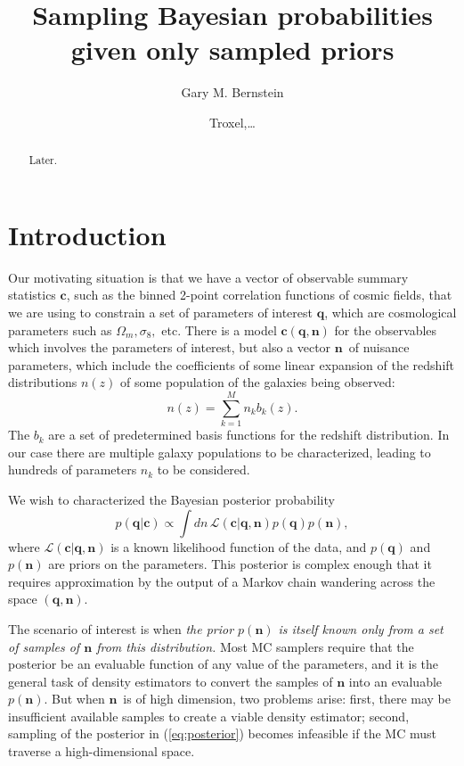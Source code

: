 \documentclass[linenumbers, onecolumn]{aastex631}
\newcommand{\vecc}{\ensuremath{\mathbf{c}}}
\newcommand{\vecq}{\ensuremath{\mathbf{q}}}
\newcommand{\vecn}{\ensuremath{\mathbf{n}}}
\newcommand{\likeli}{\mathcal{L}}
\begin{document}
\title{Sampling Bayesian probabilities given only sampled priors}

\author[0000-0002-8613-8259]{Gary M. Bernstein}

\author{Troxel,\ldots}

\begin{abstract}
	\vspace{0.2in}
Later.
\end{abstract}
\reportnum{}

\section{Introduction} \label{sec:intro}

Our motivating situation is that we have a vector of observable summary statistics \vecc, such as the binned 2-point correlation functions of cosmic fields, that we are using to constrain a set of parameters of interest \vecq, which are cosmological parameters such as $\Omega_m, \sigma_8,$ etc.  There is a model $\vecc(\vecq,\vecn)$ for the observables which involves the parameters of interest, but also a vector \vecn\ of nuisance parameters, which include the coefficients of some linear expansion of the redshift distributions $n(z)$ of some population of the galaxies being observed:
\begin{equation}
  n(z) = \sum_{k=1}^{M} n_k b_k(z).
  \label{eq:nzbasis}
\end{equation}
The $b_k$ are a set of predetermined basis functions for the redshift distribution.  In our case there are multiple galaxy populations to be characterized, leading to hundreds of parameters $n_k$ to be considered.

We wish to characterized the Bayesian posterior probability
\begin{equation}
  p(\vecq | \vecc) \propto \int dn\, \likeli(\vecc | \vecq, \vecn) p(\vecq) p(\vecn),
\label{eq:posterior}
\end{equation}
where $\likeli(\vecc | \vecq, \vecn)$ is a known likelihood function of the data, and $p(\vecq)$ and $p(\vecn)$ are priors on the parameters.  This posterior is complex enough that it requires approximation by the output of a Markov chain wandering across the space $(\vecq,\vecn).$

The scenario of interest is when \emph{the prior $p(\vecn)$ is itself known only from a set of samples of $\vecn$ from this distribution.} Most MC samplers require that the posterior be an evaluable function of any value of the parameters, and it is the general task of density estimators to convert the samples of $\vecn$ into an evaluable $p(\vecn).$  But when \vecn\ is of high dimension, two problems arise: first, there may be insufficient available samples to create a viable density estimator; second, sampling of the posterior in (\ref{eq:posterior}) becomes infeasible if the MC must traverse a high-dimensional space.
\end{document}

